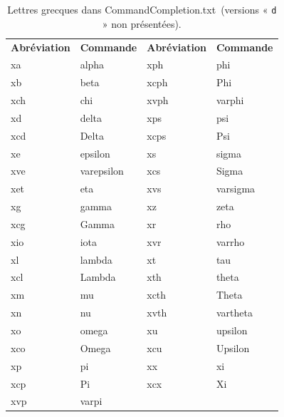 \documentclass[11pt,french]{article}
\newcommand{\CCT}{\textsf{CommandCompletion.txt}}
\begin{document}
\begin{table}\small\centering
\caption{Lettres grecques dans \CCT\ (versions « \texttt{d} » non présentées).\label{tbl:greek}}
\begin{tabular}{llll}
\textbf{Abréviation} & \textbf{Commande} & \textbf{Abréviation} & \textbf{Commande} \\
\cmidrule[0.5pt](lr){1-1} \cmidrule[0.5pt](lr){2-2} \cmidrule[0.5pt](lr){3-3} \cmidrule[0.5pt](lr){4-4}
xa  & alpha      & xph  & phi \\
xb  & beta       & xcph & Phi \\
xch & chi        & xvph & varphi \\
xd  & delta      & xps  & psi \\
xcd & Delta      & xcps & Psi \\
xe  & epsilon    & xs   & sigma \\
xve & varepsilon & xcs  & Sigma \\
xet & eta        & xvs  & varsigma \\
xg  & gamma      & xz   & zeta \\
xcg & Gamma      & xr   & rho \\
xio & iota       & xvr  & varrho \\
xl  & lambda     & xt   & tau \\
xcl & Lambda     & xth  & theta \\
xm  & mu         & xcth & Theta \\
xn  & nu         & xvth & vartheta \\
xo  & omega      & xu   & upsilon \\
xco & Omega      & xcu  & Upsilon \\
xp  & pi         & xx   & xi \\
xcp & Pi         & xcx  & Xi \\
xvp & varpi      &      & \\
\end{tabular}
\end{table}
\end{document}
